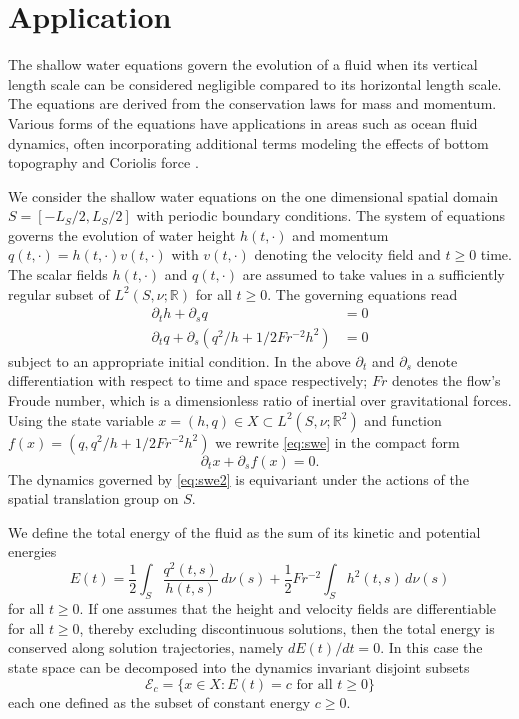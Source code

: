 \documentclass[letterpaper,10pt,3p,preprint]{elsarticle}
\newcommand{\Rbb}{\mathbb{R}}
\begin{document}
\section{Application}\label{sec:application}
The shallow water equations govern the evolution of a fluid when its
vertical length scale can be considered negligible compared to its
horizontal length scale.
The equations are derived from the conservation laws for mass and momentum.
Various forms of the equations have applications in areas such as
ocean fluid dynamics, often incorporating additional terms modeling
the effects of bottom topography and Coriolis force
\cite{Vallis2017,Whitham1999}.

We consider the shallow water equations on the one dimensional spatial
domain $S=[-L_S/2,L_S/2]$ with periodic boundary conditions.
The system of equations governs the evolution of water height
$h(t,\cdot)$ and momentum $q(t,\cdot)=h(t,\cdot)v(t,\cdot)$
with $v(t,\cdot)$ denoting the velocity field and
$t\geq 0$ time.
The scalar fields $h(t,\cdot)$ and $q(t,\cdot)$ are assumed
to take values in a sufficiently regular subset of
$L^2(S,\nu;\Rbb)$ for all $t\geq 0$.
The governing equations read
\begin{equation}\label{eq:swe}
\begin{aligned}
    \partial_th+\partial_sq&=0\\
    \partial_tq+\partial_s(q^2/h+1/2Fr^{-2}h^2)&=0
\end{aligned}
\end{equation}
subject to an appropriate initial condition.
In the above $\partial_t$ and $\partial_s$ denote differentiation
with respect to time and space respectively;
$Fr$ denotes the flow's Froude number, which is a
dimensionless ratio of inertial over gravitational forces.
Using the state variable
$x=(h,q)\in X\subset L^2(S,\nu;\Rbb^2)$
and function
$f(x)=(q,q^2/h+1/2Fr^{-2}h^2)$
we rewrite \eqref{eq:swe} in the compact form
\begin{equation}\label{eq:swe2}
    \partial_tx+\partial_sf(x)=0.
\end{equation}
The dynamics governed by \eqref{eq:swe2} is equivariant under the
actions of the spatial translation group on $S$.

We define the total energy of the fluid as the sum of its kinetic
and potential energies
\begin{equation*}
    E(t)=\frac{1}{2}\int_S\frac{q^2(t,s)}{h(t,s)}\,d\nu(s)
        +\frac{1}{2}Fr^{-2}\int_Sh^2(t,s)\,d\nu(s)
\end{equation*}
for all $t\geq 0$.
If one assumes that the height and velocity fields are differentiable
for all $t\geq 0$, thereby excluding discontinuous solutions,
then the total energy is conserved along solution trajectories,
namely $dE(t)/dt=0$.
In this case the state space can be decomposed into the dynamics
invariant disjoint subsets
\begin{equation*}
    \mathcal{E}_c=\{x\in X\colon E(t)=c\text{ for all $t\geq 0$}\}
\end{equation*}
each one defined as the subset of constant energy $c\geq 0$.
\end{document}
